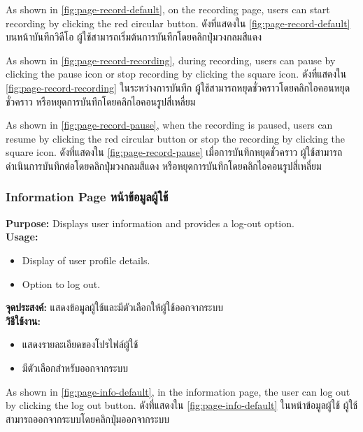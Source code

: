 \pageRecordDefault

\ifenglish
    As shown in \ref{fig:page-record-default}, on the recording page, users can start recording by clicking the red circular button.
\else
    ดังที่แสดงใน \ref{fig:page-record-default} บนหน้าบันทึกวิดีโอ ผู้ใช้สามารถเริ่มต้นการบันทึกโดยคลิกปุ่มวงกลมสีแดง
\fi

\pageRecordRecording

\ifenglish
    As shown in \ref{fig:page-record-recording}, during recording, users can pause by clicking the pause icon or stop recording by clicking the square icon.
\else
    ดังที่แสดงใน \ref{fig:page-record-recording} ในระหว่างการบันทึก ผู้ใช้สามารถหยุดชั่วคราวโดยคลิกไอคอนหยุดชั่วคราว หรือหยุดการบันทึกโดยคลิกไอคอนรูปสี่เหลี่ยม
\fi

\pageRecordPause

\ifenglish
    As shown in \ref{fig:page-record-pause}, when the recording is paused, users can resume by clicking the red circular button or stop the recording by clicking the square icon.
\else
    ดังที่แสดงใน \ref{fig:page-record-pause} เมื่อการบันทึกหยุดชั่วคราว ผู้ใช้สามารถดำเนินการบันทึกต่อโดยคลิกปุ่มวงกลมสีแดง หรือหยุดการบันทึกโดยคลิกไอคอนรูปสี่เหลี่ยม
\fi

\subsubsection{\ifenglish Information Page \else หน้าข้อมูลผู้ใช้ \fi}
\ifenglish
\textbf{Purpose:} Displays user information and provides a log-out option.\\
\textbf{Usage:}
\begin{itemize}
    \item Display of user profile details.
    \item Option to log out.
\end{itemize}
\else
\textbf{จุดประสงค์:} แสดงข้อมูลผู้ใช้และมีตัวเลือกให้ผู้ใช้ออกจากระบบ\\
\textbf{วิธีใช้งาน:}
\begin{itemize}
    \item แสดงรายละเอียดของโปรไฟล์ผู้ใช้
    \item มีตัวเลือกสำหรับออกจากระบบ
\end{itemize}
\fi

\pageInfoDefault

\ifenglish
    As shown in \ref{fig:page-info-default}, in the information page, the user can log out by clicking the log out button.
\else
    ดังที่แสดงใน \ref{fig:page-info-default} ในหน้าข้อมูลผู้ใช้ ผู้ใช้สามารถออกจากระบบโดยคลิกปุ่มออกจากระบบ
\fi
